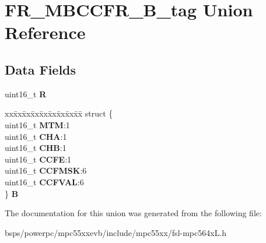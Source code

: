 \hypertarget{unionFR__MBCCFR__16B__tag}{}\section{F\+R\+\_\+\+M\+B\+C\+C\+F\+R\+\_\+B\+\_\+tag Union Reference}
\label{unionFR__MBCCFR__16B__tag}
\subsection*{Data Fields}
\begin{DoxyCompactItemize}
\item 
\mbox{\label{unionFR__MBCCFR__16B__tag_aeae52bfcea123fe0e176c932d3a0e8f6}} 
uint16\+\_\+t {\bfseries R}
\item 
\mbox{\label{unionFR__MBCCFR__16B__tag_a22873e3421f7e602c3c685efd04114a3}} 
\begin{tabbing}
xx\=xx\=xx\=xx\=xx\=xx\=xx\=xx\=xx\=\kill
struct \{\\
\>uint16\_t {\bfseries MTM}:1\\
\>uint16\_t {\bfseries CHA}:1\\
\>uint16\_t {\bfseries CHB}:1\\
\>uint16\_t {\bfseries CCFE}:1\\
\>uint16\_t {\bfseries CCFMSK}:6\\
\>uint16\_t {\bfseries CCFVAL}:6\\
\} {\bfseries B}\\

\end{tabbing}\end{DoxyCompactItemize}


The documentation for this union was generated from the following file\+:\begin{DoxyCompactItemize}
\item 
bsps/powerpc/mpc55xxevb/include/mpc55xx/fsl-\/mpc564x\+L.\+h\end{DoxyCompactItemize}
